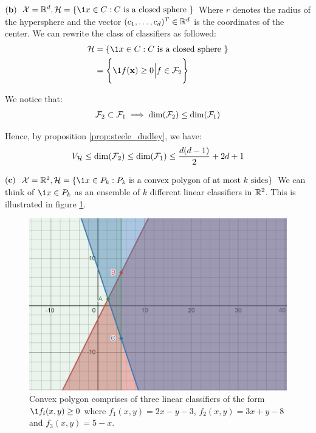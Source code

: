 \begin{solution*}
\begin{subproof}{\newline ${\bf (b)}$ $\X=\R^d, \Hf=\{ \1{x \in C} : C \text{ is a closed sphere }\}$}
        \noindent Where $r$ denotes the radius of the hypersphere and the vector $(c_1, \dots, c_d)^T\in\mathbb{R}^d$ is the coordinates of the center. We can rewrite the class of classifiers as followed:
        \begin{align*}
            \Hf&=\{ \1{x \in C} : C \text{ is a closed sphere }\} \\
            &= \biggCurl{
                \1{f({\bf x}) \ge 0} \Big| f \in \F_2
            }
        \end{align*}

        \noindent We notice that:
        \begin{align*}
            \mathcal{F}_2 \subset \mathcal{F}_1 \implies \dim(\mathcal{F}_2) \le \dim(\mathcal{F}_1)
        \end{align*}

        \noindent Hence, by proposition \ref{prop:steele_dudley}, we have:
        \begin{align*}
            V_{\mathcal{H}} \le \dim(\mathcal{F}_2) \le \dim(\mathcal{F}_1) \le \frac{d(d-1)}{2} + 2d + 1
        \end{align*}
    \end{subproof}

    \begin{subproof}{\newline ${\bf (c)}$ $\X=\R^2, \Hf=\{ \1{x \in P_k} : P_k \text{ is a convex polygon of at most $k$ sides} \}$}
        We can think of $\1{x\in P_k}$ as an ensemble of $k$ different linear classifiers in $\mathbb{R}^2$. This is illustrated in figure \ref{fig:convex_polygon_classifier}.

        \begin{figure}[!ht]
            \centering
            \includegraphics[width=\textwidth]{figures/convex_polygon_classifier.png}
            \caption{Convex polygon comprises of three linear classifiers of the form $\1{f_i(x, y)\ge0}$ where $f_1(x, y) = 2x-y-3$, $f_2(x, y)=3x+y-8$ and $f_3(x, y)=5-x$.}
            \label{fig:convex_polygon_classifier}
        \end{figure}


\end{subproof}
\end{solution*}
